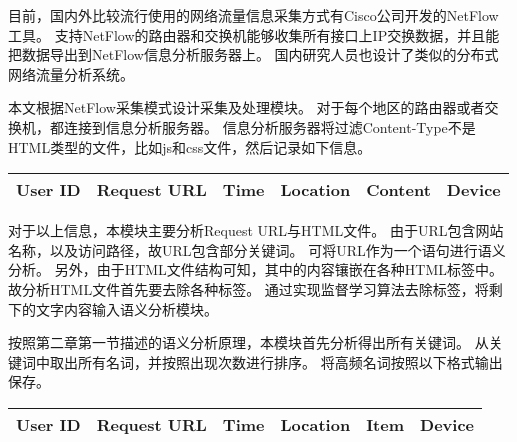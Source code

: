 \begin{center}
\end{center}
目前，国内外比较流行使用的网络流量信息采集方式有Cisco公司开发的NetFlow工具。
支持NetFlow的路由器和交换机能够收集所有接口上IP交换数据，并且能把数据导出到NetFlow信息分析服务器上。
国内研究人员也设计了类似的分布式网络流量分析系统\parencite{乔媛媛2014基于,延皓2011基于流量监测的网络用户行为分析,董超2013基于网络流量监测的移动互联网特征研究}。

本文根据NetFlow采集模式设计采集及处理模块。
对于每个地区的路由器或者交换机，都连接到信息分析服务器。
信息分析服务器将过滤Content-Type不是HTML类型的文件，比如js和css文件，然后记录如下信息。
\begin{center}
\begin{tabular}{c|c|c|c|c|c}
	\hline
	User ID & Request URL & Time & Location & Content & Device \\
	\hline
\end{tabular}
\end{center}

对于以上信息，本模块主要分析Request URL与HTML文件。
由于URL包含网站名称，以及访问路径，故URL包含部分关键词。
可将URL作为一个语句进行语义分析。
另外，由于HTML文件结构可知，其中的内容镶嵌在各种HTML标签中。
故分析HTML文件首先要去除各种标签。
通过实现监督学习算法\parencite{Kohlsch2010Boilerplate}去除标签，将剩下的文字内容输入语义分析模块。

按照第二章第一节描述的语义分析原理，本模块首先分析得出所有关键词。
从关键词中取出所有名词，并按照出现次数进行排序。
将高频名词按照以下格式输出保存。
\begin{center}
\begin{tabular}{c|c|c|c|c|c}
	\hline
	User ID & Request URL & Time & Location & Item & Device \\
	\hline
\end{tabular}
\end{center}
